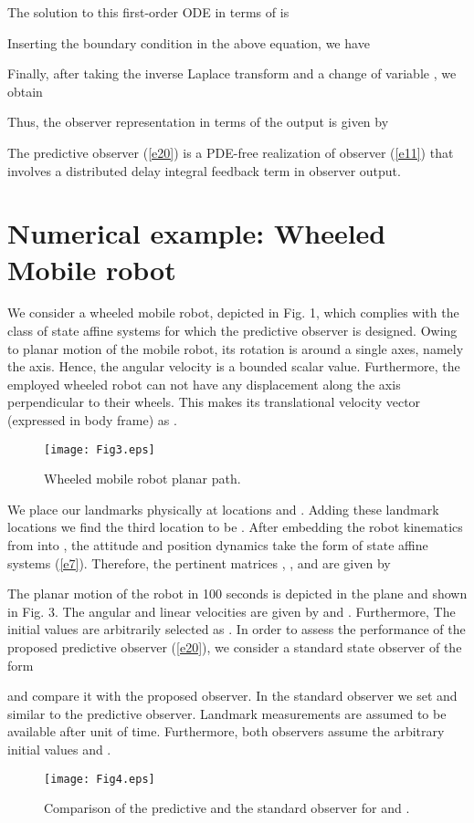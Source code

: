\documentclass[12pt,draftcls,onecolumn]{IEEEtran}
\begin{document}
The solution to this first-order ODE in terms of  is

Inserting the boundary condition  in the above equation, we have 

Finally, after taking the inverse Laplace transform and a change of variable , we obtain

Thus, the observer representation in terms of the output is given by

The predictive observer (\ref{e20}) is a PDE-free realization of observer (\ref{e11}) that involves a distributed delay integral feedback term in observer output.


\section{Numerical example: Wheeled Mobile robot}

We consider a wheeled mobile robot, depicted in Fig. 1, which complies with the class of state affine systems for which the predictive observer is designed. 
Owing to planar motion of the mobile robot, its rotation is around a single axes, namely the  axis. Hence, the angular velocity  is a bounded scalar value. Furthermore, the employed wheeled robot can not have any displacement along the axis perpendicular to their wheels. This makes its translational velocity vector (expressed in body frame) as  .
\begin{figure}[thpb]  \label{F3}
\centering
\texttt{[image: Fig3.eps]}
\caption{Wheeled mobile robot planar path. }
\end{figure}

We place our landmarks physically at locations  and . Adding these landmark locations we find the third location to be . After embedding the robot kinematics from  into , the attitude and position dynamics take the form of state affine systems (\ref{e7}). Therefore, the pertinent matrices , , and  are given by
 
The planar motion of the robot in 100 seconds is depicted in the  plane and shown in Fig. 3. The angular and linear velocities are given by  and . Furthermore, The initial values are arbitrarily selected as . In order to assess the performance of the proposed predictive observer (\ref{e20}), we consider a standard state observer of the form \cite{c20}

and compare it with the proposed observer. In the standard observer we set  and  similar to the predictive observer. Landmark measurements are assumed to be available after  unit of time. Furthermore, both observers assume the arbitrary initial values  and .
\begin{figure}[thpb] \label{F4}
\centering
\texttt{[image: Fig4.eps]}
\caption{Comparison of the predictive and the standard observer for  and . }
\end{figure}
\end{document}
